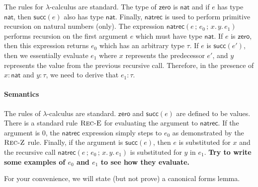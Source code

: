 \documentclass{article}
\newcommand{\lc}{$\lambda$-calculus}
\newcommand{\m}[1]{\mathsf{#1}}
\newcommand{\elam}[2]{\lambda{#1}.\,{#2}}
\newcommand{\eapp}[2]{#1 \; #2}
\newcommand{\step}{\mapsto}
\newcommand{\val}[1]{#1 \; \m{value}}
\newcommand{\zero}{\m{zero}}
\renewcommand{\succ}[1]{\m{succ}(#1)}
\newcommand{\semi}{\,;\,}
\newcommand{\natrec}[5]{\m{natrec}(#1 \semi #2 \semi #3.\, #4. \, #5)}
\newcommand{\tnat}{\m{nat}}
\begin{document}
The rules for \lc{} are standard. The type of $\zero$ is $\tnat$ and if $e$ has type $\tnat$,
then $\succ{e}$ also has type $\tnat$.
Finally, $\m{natrec}$ is used to perform primitive recursion on natural numbers (only). The expression
$\natrec{e}{e_0}{x}{y}{e_1}$ performs recursion on the first argument $e$ which must have type $\tnat$.
If $e$ is $\zero$, then this expression returns $e_0$ which has an arbitrary type $\tau$.
If $e$ is $\succ{e'}$, then we essentially evaluate $e_1$ where $x$ represents the predecessor $e'$,
and $y$ represents the value from the previous recursive call.
Therefore, in the presence of $x : \tnat$ and $y : \tau$, we need to derive that $e_1 : \tau$.


\paragraph*{Semantics}

The rules of \lc{} are standard. $\zero$ and $\succ{e}$ are defined to be values.
There is a standard rule $\textsc{Rec-E}$ for evaluating the argument to $\m{natrec}$.
If the argument is $0$, the $\m{natrec}$ expression simply steps to $e_0$ as
demonstrated by the $\textsc{Rec-Z}$ rule.
Finally, if the argument is $\succ{e}$, then $e$ is substituted for $x$ and
the recursive call $\natrec{e}{e_0}{x}{y}{e_1}$ is substituted for $y$ in $e_1$.
\textbf{Try to write some examples of $e_0$ and $e_1$ to see how they evaluate.}

For your convenience, we will state (but not prove) a canonical forms lemma.
\end{document}
